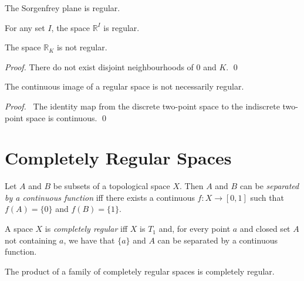 \begin{cor}
The Sorgenfrey plane is regular.
\end{cor}

\begin{cor}
 For any set $I$, the space $\mathbb{R}^I$ is regular.
\end{cor}

\begin{prop}
The space $\mathbb{R}_K$ is not regular.
\end{prop}

\begin{proof}
\pf There do not exist disjoint neighbourhoods of 0 and $K$. \qed
\end{proof}

\begin{prop}
The continuous image of a regular space is not necessarily regular.
\end{prop}

\begin{proof}
\pf\ The identity map from the discrete two-point space to the indiscrete two-point space is continuous. \qed
\end{proof}

\section{Completely Regular Spaces}

 \begin{df}
 Let $A$ and $B$ be subsets of a topological space $X$. Then $A$ and $B$ can
 be \emph{separated by a continuous function} iff there exists a continuous
 $f : X \rightarrow [0,1]$ such that $f(A) = \{ 0 \}$ and $f(B) = \{ 1 \}$.
\end{df}

  \begin{df}
  A space $X$ is \emph{completely regular} iff $X$ is $T_1$ and, for every
  point $a$ and closed set $A$ not containing $a$, we have that $\{a\}$ and
  $A$ can be separated by a continuous function.
\end{df}

 \begin{thm}
   \label{thm:topology:completely_regular:product}
The product of a family of completely regular spaces is completely regular.
\end{thm}

